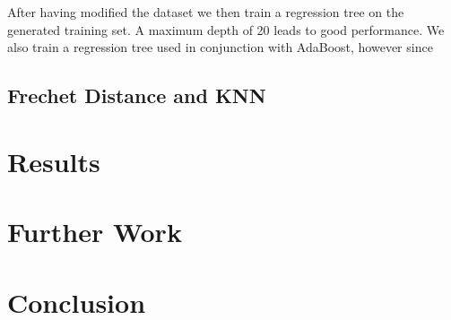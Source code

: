 \documentclass[12pt]{article}
\begin{document}
After having modified the dataset we then train a regression tree on the generated training set. A maximum depth of 20 leads to good performance. We also train a regression tree used in conjunction with AdaBoost, however since 

\subsection{Frechet Distance and KNN}


\section{Results}

\section{Further Work}

\section{Conclusion}
\end{document}
